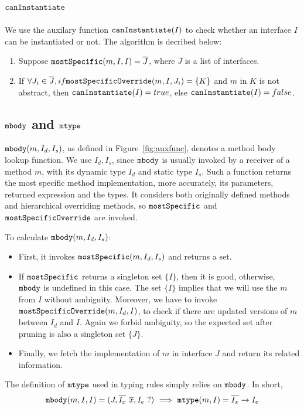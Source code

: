 \subsection{$\texttt{canInstantiate}$}
We use the auxilary function $\texttt{canInstantiate}(I)$ to check whether an interface $I$ can be instantiated or not.
The algorithm is decribed below:
\begin{enumerate}
\item Suppose $\texttt{mostSpecific}(m, I, I) = \overline{J}$, where $\overline{J}$ is a list of interfaces.
\item If $\forall J_i \in \overline{J}, if \texttt{mostSpecificOverride}(m, I, J_i) = \{ K \} $ and $m$ in $K$ is not abstract, 
then $\texttt{canInstantiate}(I) = true$, else $\texttt{canInstantiate}(I) = false$.
\end{enumerate}

\subsection{$\texttt{mbody}$ and $\texttt{mtype}$}

$\texttt{mbody}(m, I_d, I_s)$, as defined in Figure~\ref{fig:auxfunc}, denotes a method body lookup function.
We use $I_d, I_s$, since $\texttt{mbody}$ is usually invoked by a receiver of a method $m$, with its dynamic
type $I_d$ and static type $I_s$. Such a function returns the most specific method implementation, more
accurately, its parameters, returned expression and the types. It considers both originally defined methods and hierarchical overriding methods, so $\texttt{mostSpecific}$ and $\texttt{mostSpecificOverride}$ are invoked.

To calculate $\texttt{mbody}(m, I_d, I_s)$:
\begin{itemize}
    \item First, it invokes $\texttt{mostSpecific}(m, I_d, I_s)$ and returns a set.
    \item If $\texttt{mostSpecific}$ returns a singleton set $\{I\}$, then it is good, otherwise, $\texttt{mbody}$ is undefined in
    this case. The set $\{I\}$ implies that we will use the $m$ from $I$ without ambiguity. Moreover, we have to invoke $\texttt{mostSpecificOverride}(m, I_d, I)$, to check if there are updated versions of $m$ between $I_d$ and $I$. Again we forbid ambiguity, so the expected set after pruning is also a singleton set $\{J\}$.
    \item Finally, we fetch the implementation of $m$ in interface $J$ and return its related information.
\end{itemize}
The definition of $\texttt{mtype}$ used in typing rules simply relies on $\texttt{mbody}$. In short,
$$\texttt{mbody}(m, I, I) = (J, \overline{I_x}\ \overline{x}, I_e\ ?) \ \Longrightarrow\ \texttt{mtype}(m, I) = \overline{I_x}\rightarrow I_e$$

